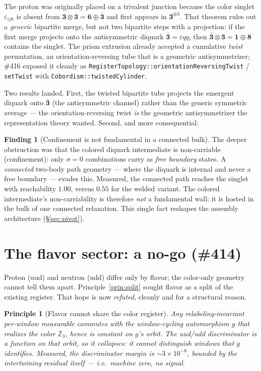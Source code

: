 \documentclass[11pt]{article}
\newtheorem{principle}{Principle}
\theoremstyle{definition}
\newtheorem{finding}{Finding}
\newcommand{\Z}{\mathbb{Z}}
\newcommand{\rep}[1]{\mathbf{#1}}
\newcommand{\triv}{\mathbf{1}}
\newcommand{\sigmacol}{\sigma}
\newcommand{\code}[1]{\texttt{#1}}
\begin{document}
The proton was originally placed on a trivalent junction because the color singlet
$\varepsilon_{ijk}$ is absent from $\rep3\otimes\rep3=\rep6\oplus\bar{\rep3}$ and first
appears in $\rep3^{\otimes3}$. That theorem rules out a \emph{generic} bipartite merge,
but not two bipartite steps with a projection: if the first merge projects onto the
antisymmetric diquark $\bar{\rep3}=\varepsilon qq$, then
$\bar{\rep3}\otimes\rep3=\triv\oplus\rep8$ contains the singlet. The prism extrusion
already accepted a cumulative \emph{twist} permutation, an orientation-reversing tube that
is a geometric antisymmetrizer; \#416 exposed it cleanly as
\code{RegisterTopology::orientationReversingTwist} / \code{setTwist} with
\code{Cobordism::twistedCylinder}.

Two results landed. First, the twisted bipartite tube projects the emergent diquark onto
$\bar{\rep3}$ (the antisymmetric channel) rather than the generic symmetric average ---
the orientation-reversing twist \emph{is} the geometric antisymmetrizer the
representation theory wanted. Second, and more consequential:

\begin{finding}[Confinement is not fundamental in a connected bulk]
\label{find:reach}
The deeper obstruction was that the colored diquark intermediate is non-carriable
(confinement): only $\sigmacol=0$ combinations carry as \emph{free boundary} states. A
\emph{connected} two-body path geometry --- where the diquark is internal and never a free
boundary --- evades this. Measured, the connected path reaches the singlet with
reachability $1.00$, versus $0.55$ for the welded variant. The colored intermediate's
non-carriability is therefore \emph{not} a fundamental wall: it is hosted in the bulk of one
connected relaxation. This single fact reshapes the assembly architecture (\S\ref{sec:pivot}).
\end{finding}

\section{The flavor sector: a no-go (\#414)}
\label{sec:flavor}

Proton (uud) and neutron (udd) differ only by flavor; the color-only geometry cannot tell
them apart. Principle~\ref{prin:split} sought flavor as a split of the existing register.
That hope is now \emph{refuted}, cleanly and for a structural reason.

\begin{principle}[Flavor cannot share the color register]
\label{prin:flavor-nogo}
Any relabeling-invariant per-window measurable commutes with the window-cycling
automorphism $g$ that realizes the color $\Z_3$, hence is constant on $g$'s orbit. The
uud/udd discriminator is a function on that orbit, so it collapses: it cannot distinguish
windows that $g$ identifies. Measured, the discriminator margin is $\sim 3\times10^{-6}$,
bounded by the intertwining residual itself --- i.e.\ machine zero, no signal.
\end{principle}
\end{document}
